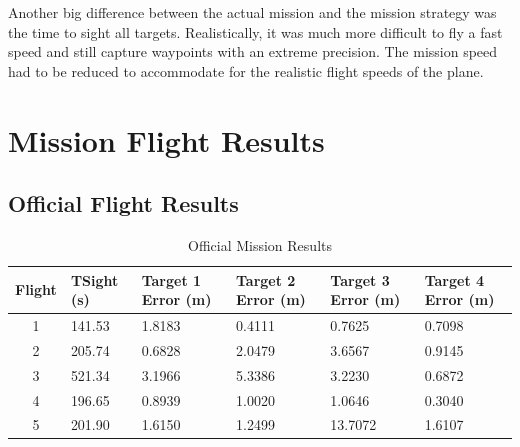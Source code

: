 \documentclass[11pt]{article}
\begin{document}
Another big difference between the actual mission and the mission strategy was the time to sight all targets. Realistically, it was much more difficult to fly a fast speed and still capture waypoints with an extreme precision. The mission speed had to be reduced to accommodate for the realistic flight speeds of the plane.



\section{Mission Flight Results}
	\label{MissionFlightResults}
	\subsection{Official Flight Results}
	\label{OffFltRes}
\begin{table}[!ht]
\caption{Official Mission Results}
\label{tab:ResultsSummary}
\begin{center}
    \begin{tabular}{ | c | p{2cm} | p{2cm} | p{2cm} | p{2cm} | p{2cm} |}
    \hline
    \textbf{Flight} & \textbf{TSight (s)} & \textbf{Target 1 \newline Error (m)} & \textbf{Target 2 \newline Error (m)} & \textbf{Target 3 \newline Error (m)} & \textbf{Target 4 \newline Error (m)} \\ \hline
    1 & 141.53 & 1.8183 & 0.4111 & 0.7625 & 0.7098\\ \hline
    2 & 205.74 & 0.6828 & 2.0479 & 3.6567 & 0.9145\\ \hline
    3 & 521.34 & 3.1966 & 5.3386 & 3.2230 & 0.6872\\ \hline
    4 & 196.65 & 0.8939 & 1.0020 & 1.0646 & 0.3040\\ \hline
    5 & 201.90 & 1.6150 & 1.2499 & 13.7072 & 1.6107\\ \hline
    \end{tabular}
\end{center}
\end{table}
\end{document}

